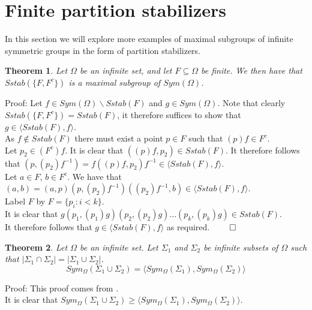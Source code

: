 \documentclass{report}
\newtheorem{theorem}{Theorem}[section]
\begin{document}
\section{Finite partition stabilizers}
In this section we will explore more examples of maximal subgroups of infinite symmetric groups in the form of partition stabilizers.
\begin{theorem}\label{finstab}
Let $\Omega$ be an infinite set, and let $F \subseteq \Omega$ be finite. We then have that $Sstab(\{F,F^c\})$ is a maximal subgroup of $Sym(\Omega)$.
\end{theorem}\par
Proof: Let $f\in Sym(\Omega)\backslash Sstab(F)$ and $g \in Sym(\Omega)$. Note that clearly $Sstab(\{F,F^c\})=Sstab(F)$, it therefore suffices to show that $g \in \langle Sstab(F), f \rangle$.\\
As $f \notin Sstab(F)$ there must exist a point $p \in F$ such that $(p)f \in F^c$.\\
Let $p_2 \in (F^c)f$. It is clear that $((p)f, p_2) \in Sstab(F)$. It therefore follows that $(p , (p_2)f^{-1})=f ((p)f,  p_2) f^{-1} \in \langle Sstab(F),f\rangle$.\\
Let $a\in F$, $b\in F^c$. We have that $(a ,b)=(a, p)(p, (p_2)f^{-1})((p_2)f^{-1}, b) \in \langle Sstab(F),f\rangle$.\\
Label $F$ by $F = \{p_i:i<k\}$.\\
It is clear that $g(p_1, (p_1)g)(p_2, (p_2)g) \ldots (p_k, (p_k)g)\in  Sstab(F)$.\\
It therefore follows that $g \in \langle Sstab(F), f \rangle$ as required. $\qed$
\begin{theorem}\label{symgroupintergen}
Let $\Omega$ be an infinite set. Let $\Sigma_1$ and $\Sigma_2$ be infinite subsets of $\Omega$ such that $\vert \Sigma_1 \cap\Sigma_2 \vert = \vert \Sigma_1 \cup\Sigma_2 \vert$.
\[Sym_{\Omega}(\Sigma_1 \cup \Sigma_2) = \langle Sym_{\Omega}(\Sigma_1) ,Sym_{\Omega}(\Sigma_2)  \rangle\]
\end{theorem}\par
Proof: This proof comes from \cite{symgroupintergen}.\\
It is clear that $Sym_{\Omega}(\Sigma_1 \cup \Sigma_2) \geq \langle Sym_{\Omega}(\Sigma_1) ,Sym_{\Omega}(\Sigma_2)  \rangle$.\\
\end{document}
